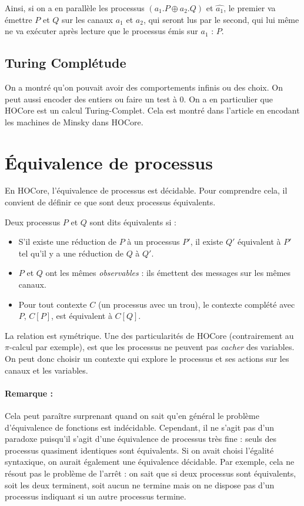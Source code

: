 \documentclass[11pt]{article}
\def\pic{$\pi$-calcul }
\def\+{\oplus}
\begin{document}
Ainsi, si on a en parallèle les processus $(a_1.P\+ a_2.Q)$ et  $\hat{a_1}$, le premier va émettre $P$ et $Q$ sur les canaux $a_1$ et $a_2$, qui seront lus par le second, qui lui même ne va exécuter après lecture que le processus émis sur $a_1$ : $P$. 

\subsection{Turing Complétude}
On a montré qu'on pouvait avoir des comportements infinis ou des choix. On peut aussi encoder des entiers ou faire un test à 0. %
On a en particulier que HOCore est un calcul Turing-Complet.
Cela est montré dans l'article \cite{expressiveness} en encodant les machines de Minsky dans HOCore.


\section{Équivalence de processus}
En HOCore, l'équivalence de processus est décidable. Pour comprendre cela, il convient de définir ce que sont deux processus équivalents.

Deux processus $P$ et $Q$ sont dits équivalents si :
\begin{itemize}
\item S'il existe une réduction de $P$ à un processus $P'$, il existe $Q'$ équivalent à $P'$ tel qu'il y a une réduction de $Q$ à $Q'$. 
\item $P$ et $Q$ ont les mêmes \textit{observables} : ils émettent des messages sur les mêmes canaux.  
\item Pour tout contexte $C$ (un processus avec un trou), le contexte complété avec $P$, $C[P]$, est équivalent à $C[Q]$.
\end{itemize}
La relation est symétrique. Une des particularités de HOCore (contrairement au \pic par exemple), est que les processus ne peuvent pas \textit{cacher} des variables. On peut donc choisir un contexte qui explore le processus et ses actions sur les canaux et les variables. 


\paragraph{Remarque :} Cela peut paraître surprenant quand on sait qu'en général le problème d'équivalence de fonctions est indécidable. Cependant, il ne s'agit pas d'un paradoxe puisqu'il s'agit d'une équivalence de processus très fine : seuls des processus quasiment identiques sont équivalents. Si on avait choisi l'égalité syntaxique, on aurait également une équivalence décidable.  Par exemple, cela ne résout pas le problème de l'arrêt : on sait que si deux processus sont équivalents, soit les deux terminent, soit aucun ne termine mais on ne dispose pas d'un processus indiquant si un autre processus termine. 
\end{document}
